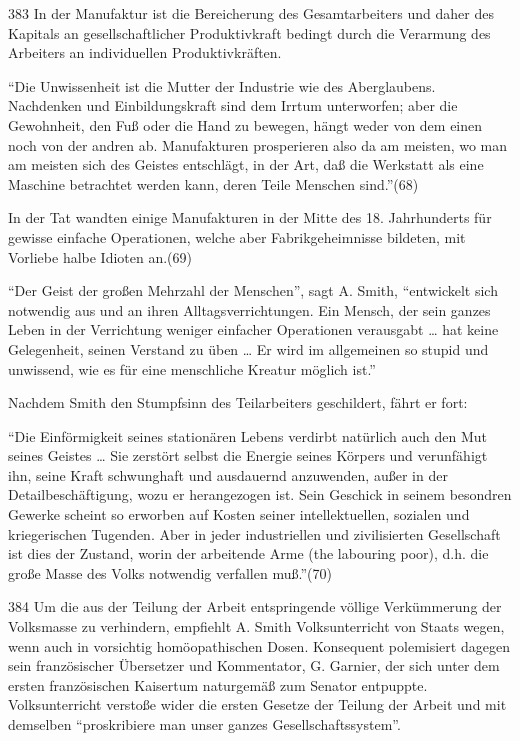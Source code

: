{\num{383} In der Manufaktur ist die Bereicherung des
Gesamtarbeiters und daher des Kapitals an gesellschaftlicher
Produktivkraft bedingt durch die Verarmung des Arbeiters an
individuellen Produktivkräften.

``Die Unwissenheit ist die Mutter der Industrie wie des Aberglaubens.
Nachdenken und Einbildungskraft sind dem Irrtum unterworfen; aber die
Gewohnheit, den Fuß oder die Hand zu bewegen, hängt weder von dem einen
noch von der andren ab. Manufakturen prosperieren also da am meisten, wo
man am meisten sich des Geistes entschlägt, in der Art, daß die
Werkstatt als eine Maschine betrachtet werden kann, deren Teile Menschen
sind.''(68)

In der Tat wandten einige Manufakturen in der Mitte des 18. Jahrhunderts
für gewisse einfache Operationen, welche aber Fabrikgeheimnisse
bildeten, mit Vorliebe halbe Idioten an.(69)

``Der Geist der großen Mehrzahl der Menschen'', sagt A. Smith,
``entwickelt sich notwendig aus und an ihren Alltagsverrichtungen. Ein
Mensch, der sein ganzes Leben in der Verrichtung weniger einfacher
Operationen verausgabt \ldots{} hat keine Gelegenheit, seinen Verstand
zu üben \ldots{} Er wird im allgemeinen so stupid und unwissend, wie es
für eine menschliche Kreatur möglich ist.''

Nachdem Smith den Stumpfsinn des Teilarbeiters geschildert, fährt er
fort:

``Die Einförmigkeit seines stationären Lebens verdirbt natürlich auch
den Mut seines Geistes \ldots{} Sie zerstört selbst die Energie seines
Körpers und verunfähigt ihn, seine Kraft schwunghaft und ausdauernd
anzuwenden, außer in der Detailbeschäftigung, wozu er herangezogen ist.
Sein Geschick in seinem besondren Gewerke scheint so erworben auf Kosten
seiner intellektuellen, sozialen und kriegerischen Tugenden. Aber in
jeder industriellen und zivilisierten Gesellschaft ist dies der Zustand,
worin der arbeitende Arme (the labouring poor), d.h. die große Masse des
Volks notwendig verfallen muß.''(70)

\num{384} Um die aus der Teilung der Arbeit
entspringende völlige Verkümmerung der Volksmasse zu verhindern,
empfiehlt A. Smith Volksunterricht von Staats wegen, wenn auch in
vorsichtig homöopathischen Dosen. Konsequent polemisiert dagegen sein
französischer Übersetzer und Kommentator, G. Garnier, der sich unter dem
ersten französischen Kaisertum naturgemäß zum Senator entpuppte.
Volksunterricht verstoße wider die ersten Gesetze der Teilung der Arbeit
und mit demselben ``proskribiere man unser ganzes Gesellschaftssystem''.

}
